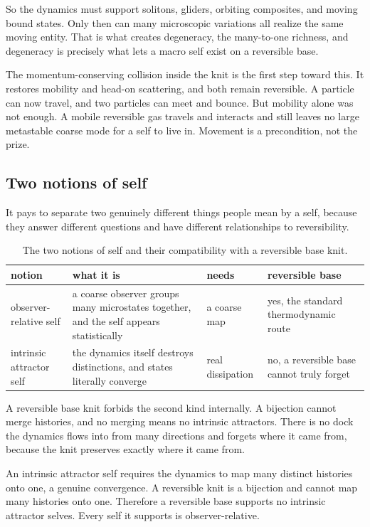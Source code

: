 So the dynamics must support solitons, gliders, orbiting composites, and moving bound states. Only then can many microscopic variations all realize the same moving entity. That is what creates degeneracy, the many-to-one richness, and degeneracy is precisely what lets a macro self exist on a reversible base.

The momentum-conserving collision inside the knit is the first step toward this. It restores mobility and head-on scattering, and both remain reversible. A particle can now travel, and two particles can meet and bounce. But mobility alone was not enough. A mobile reversible gas travels and interacts and still leaves no large metastable coarse mode for a self to live in. Movement is a precondition, not the prize.

\subsection{Two notions of self}

It pays to separate two genuinely different things people mean by a self, because they answer different questions and have different relationships to reversibility.

\begin{table}[ht]
\centering
\begin{tabular}{@{}p{}p{}p{}p{}@{}}
\toprule
notion & what it is & needs & reversible base \\
\midrule
observer-relative self & a coarse observer groups many microstates together, and the self appears statistically & a coarse map & yes, the standard thermodynamic route \\
intrinsic attractor self & the dynamics itself destroys distinctions, and states literally converge & real dissipation & no, a reversible base cannot truly forget \\
\bottomrule
\end{tabular}
\caption{The two notions of self and their compatibility with a reversible base knit.}
\label{tab:two-selves}
\end{table}

A reversible base knit forbids the second kind internally. A bijection cannot merge histories, and no merging means no intrinsic attractors. There is no dock the dynamics flows into from many directions and forgets where it came from, because the knit preserves exactly where it came from.

\begin{lemma}
An intrinsic attractor self requires the dynamics to map many distinct histories onto one, a genuine convergence. A reversible knit is a bijection and cannot map many histories onto one. Therefore a reversible base supports no intrinsic attractor selves. Every self it supports is observer-relative.
\end{lemma}

